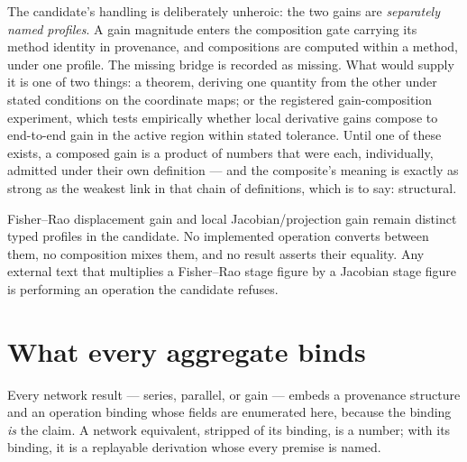 The candidate's handling is deliberately unheroic: the two gains are
\emph{separately named profiles}. A gain magnitude enters the composition
gate carrying its method identity in provenance, and compositions are
computed within a method, under one profile. The missing bridge is
recorded as missing. What would supply it is one of two things: a theorem,
deriving one quantity from the other under stated conditions on the
coordinate maps; or the registered gain-composition experiment, which
tests empirically whether local derivative gains compose to end-to-end
gain in the active region within stated tolerance. Until one of these
exists, a composed gain is a product of numbers that were each,
individually, admitted under their own definition --- and the composite's
meaning is exactly as strong as the weakest link in that chain of
definitions, which is to say: structural.

\begin{conflict}\label{ch09:conf:gain}
Fisher--Rao displacement gain and local Jacobian/projection gain remain
distinct typed profiles in the candidate. No implemented operation
converts between them, no composition mixes them, and no result asserts
their equality. Any external text that multiplies a Fisher--Rao stage
figure by a Jacobian stage figure is performing an operation the candidate
refuses.
\end{conflict}

\section{What every aggregate binds}\label{ch09:sec:binding}

Every network result --- series, parallel, or gain --- embeds a provenance
structure and an operation binding whose fields are enumerated here,
because the binding \emph{is} the claim. A network equivalent, stripped of
its binding, is a number; with its binding, it is a replayable derivation
whose every premise is named.

